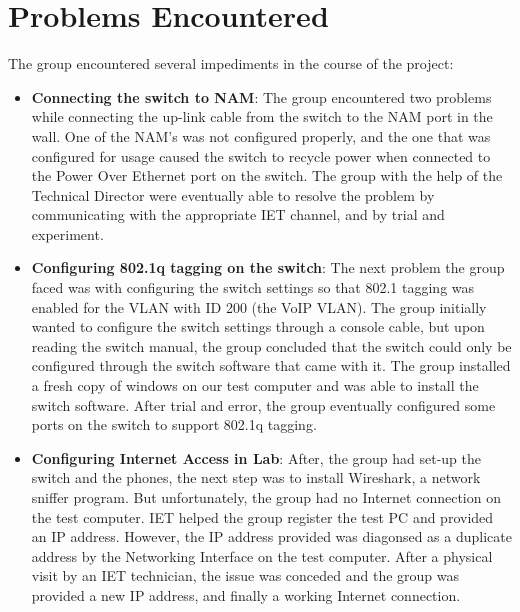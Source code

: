 \section{Problems Encountered}

The group encountered several impediments in the course of the project:

\begin{itemize}

\item \textbf{Connecting the switch to NAM}: The group encountered two problems while connecting the up-link cable from the switch to the NAM port in the wall. One of the NAM's was not configured properly, and the one that was configured for usage caused the switch to recycle power when connected to the Power Over Ethernet port on the switch. The group with the help of the Technical Director were eventually able to resolve the problem by communicating with the appropriate IET channel, and by trial and experiment.

\item \textbf{Configuring 802.1q tagging on the switch}: The next problem the group faced was with configuring the switch settings so that 802.1 tagging was enabled for the VLAN with ID 200 (the VoIP VLAN). The group initially wanted to configure the switch settings through a console cable, but upon reading the switch manual, the group concluded that the switch could only be configured through the switch software that came with it. The group installed a fresh copy of windows on our test computer and was able to install the switch software. After trial and error, the group eventually configured some ports on the switch to support 802.1q tagging.


\item \textbf{Configuring Internet Access in Lab}: After, the group had set-up the switch and the phones, the next step was to install Wireshark, a network sniffer program. But unfortunately, the group had no Internet connection on the test computer. IET helped the group register the test PC and provided an IP address. However, the IP address provided was diagonsed as a duplicate address by the Networking Interface on the test computer. After a physical visit by an IET technician, the issue was conceded and the group was provided a new IP address, and finally a working Internet connection. 

\end{itemize}